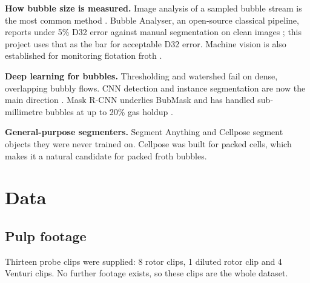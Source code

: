 \textbf{How bubble size is measured.} Image analysis of a sampled bubble
stream is the most common method \citep{gomez2007, grau2005}. Bubble
Analyser, an open-source classical pipeline, reports under 5\% D32 error
against manual segmentation on clean images \citep{mesa2022}; this
project uses that as the bar for acceptable D32 error. Machine vision is
also established for monitoring flotation froth \citep{aldrich2010}.

\textbf{Deep learning for bubbles.} Thresholding and watershed
\citep{vincent1991} fail on dense, overlapping bubbly flows. CNN
detection and instance segmentation are now the main direction
\citep{cerqueira2021, wang2021, he2022, hessenkemper2022}. Mask R-CNN
\citep{he2017} underlies BubMask \citep{kim2021} and has handled
sub-millimetre bubbles at up to 20\% gas holdup \citep{cui2022}.

\textbf{General-purpose segmenters.} Segment Anything
\citep[SAM,][]{kirillov2023} and Cellpose
\citep{stringer2021, pachitariu2025} segment objects they were never
trained on. Cellpose was built for packed cells, which makes it a
natural candidate for packed froth bubbles.

\hypertarget{data}{%
\section{Data}\label{data}}

\hypertarget{pulp-footage}{%
\subsection{Pulp footage}\label{pulp-footage}}

Thirteen probe clips were supplied: 8 rotor clips, 1 diluted rotor clip
and 4 Venturi clips. No further footage exists, so these clips are the
whole dataset.

